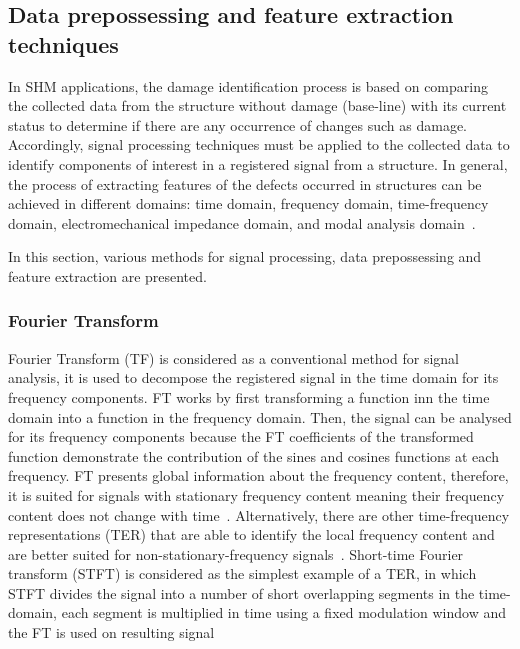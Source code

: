 \subsection[Data prepossessing and FE]{Data prepossessing and feature extraction techniques}		

In SHM applications, the damage identification process is based on comparing the collected data from the structure without damage (base-line) with its current status to determine if there are any occurrence of changes such as damage.
Accordingly, signal processing techniques must be applied to the collected data to identify components of interest in a registered signal from a structure.
In general, the process of extracting features of the defects occurred in structures can be achieved in different domains: time domain, frequency domain, time-frequency domain, electromechanical impedance domain, and modal analysis domain~\cite{Khan2019}.

In this section, various methods for signal processing, data prepossessing and feature extraction are presented.

\subsubsection{Fourier Transform} 
Fourier Transform (TF) is considered as a conventional method for signal analysis, it is used to decompose the registered signal in the time domain for its frequency components. 
FT works by first transforming a function inn the time domain into a function in the frequency domain. 
Then, the signal can be analysed for its frequency components because the FT coefficients of the transformed function demonstrate the contribution of the sines and cosines functions at each frequency.
FT presents global information about the frequency content, therefore, it is suited for signals with stationary frequency content meaning their frequency content does not change with time~\cite{Raghavan2006}.
Alternatively, there are other time-frequency representations (TER) that are able to identify the local frequency content and are better suited for non-stationary-frequency signals~\cite{Raghavan2006}.
Short-time Fourier transform (STFT) is considered as the simplest example of a TER, in which STFT divides the signal into a number of short overlapping segments in the time-domain, each segment is multiplied in time using a fixed modulation window and the FT is used on resulting signal~\cite{Raghavan2006}

